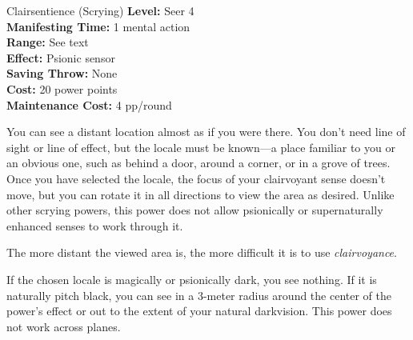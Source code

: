 {Clairsentience (Scrying)}
{
	\textbf{Level:}
	Seer 4\\
	\textbf{Manifesting Time:}
	1 mental action\\
	\textbf{Range:}
	See text\\
	\textbf{Effect:}
	Psionic sensor\\
	\textbf{Saving Throw:}
	None\\
	\textbf{Cost:}
	20 power points\\
	\textbf{Maintenance Cost:}
	4 pp/round\\
}
{
	You can see a distant location almost as if you were there. You don't need line of sight or line of effect, but the locale must be known---a place familiar to you or an obvious one, such as behind a door, around a corner, or in a grove of trees. Once you have selected the locale, the focus of your clairvoyant sense doesn't move, but you can rotate it in all directions to view the area as desired. Unlike other scrying powers, this power does not allow psionically or supernaturally enhanced senses to work through it.

	The more distant the viewed area is, the more difficult it is to use \emph{clairvoyance}.


	If the chosen locale is magically or psionically dark, you see nothing. If it is naturally pitch black, you can see in a 3-meter radius around the center of the power's effect or out to the extent of your natural darkvision. This power does not work across planes. 
}
